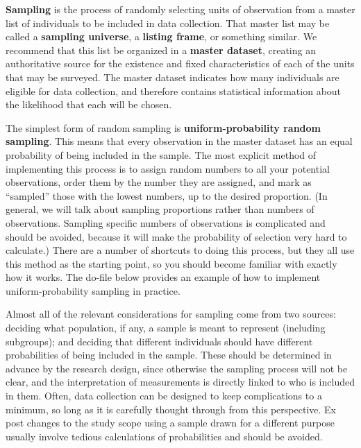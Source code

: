 \textbf{Sampling} is the process of randomly selecting units of observation
from a master list of individuals to be included in data collection.
That master list may be called a \textbf{sampling universe}, a \textbf{listing frame}, or something similar.
We recommend that this list be organized in a \textbf{master dataset},
creating an authoritative source for the existence and fixed
characteristics of each of the units that may be surveyed.
The master dataset indicates how many individuals are eligible for data collection,
and therefore contains statistical information about the likelihood that each will be chosen.

The simplest form of random sampling is \textbf{uniform-probability random sampling}.
This means that every observation in the master dataset
has an equal probability of being included in the sample.
The most explicit method of implementing this process
is to assign random numbers to all your potential observations,
order them by the number they are assigned,
and mark as ``sampled'' those with the lowest numbers, up to the desired proportion.
(In general, we will talk about sampling proportions rather than numbers of observations.
Sampling specific numbers of observations is complicated and should be avoided,
because it will make the probability of selection very hard to calculate.)
There are a number of shortcuts to doing this process,
but they all use this method as the starting point,
so you should become familiar with exactly how it works.
The do-file below provides an example of how to implement uniform-probability sampling in practice. 


Almost all of the relevant considerations for sampling come from two sources:
deciding what population, if any, a sample is meant to represent (including subgroups);
and deciding that different individuals should have different probabilities
of being included in the sample.
These should be determined in advance by the research design,
since otherwise the sampling process will not be clear,
and the interpretation of measurements is directly linked to who is included in them.
Often, data collection can be designed to keep complications to a minimum,
so long as it is carefully thought through from this perspective.
Ex post changes to the study scope using a sample drawn for a different purpose
usually involve tedious calculations of probabilities and should be avoided.


